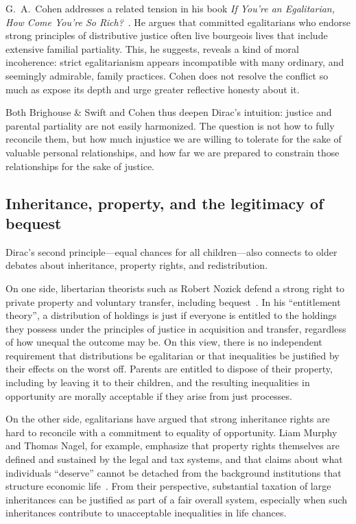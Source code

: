 \documentclass[%
  reprint,
  superscriptaddress,
  amsmath,amssymb,
  pra,
  floatfix,
  longbibliography
]{revtex4-2}
\begin{document}
G.~A.~Cohen addresses a related tension in his book
\emph{If You're an Egalitarian, How Come You're So Rich?}~\cite{Cohen2000}.
He argues that committed egalitarians who endorse strong principles of
distributive justice often live bourgeois lives that include extensive
familial partiality.  This, he suggests, reveals a kind of moral
incoherence: strict egalitarianism appears incompatible with many
ordinary, and seemingly admirable, family practices.  Cohen does not
resolve the conflict so much as expose its depth and urge greater
reflective honesty about it.

Both Brighouse \& Swift and Cohen thus deepen Dirac's intuition:
justice and parental partiality are not easily harmonized.  The
question is not how to fully reconcile them, but how much injustice we
are willing to tolerate for the sake of valuable personal
relationships, and how far we are prepared to constrain those
relationships for the sake of justice.

\subsection{Inheritance, property, and the legitimacy of bequest}

Dirac's second principle---equal chances for all children---also
connects to older debates about inheritance, property rights, and
redistribution.

On one side, libertarian theorists such as Robert Nozick defend a
strong right to private property and voluntary transfer, including
bequest~\cite{Nozick1974}.  In his ``entitlement theory'', a
distribution of holdings is just if everyone is entitled to the
holdings they possess under the principles of justice in acquisition
and transfer, regardless of how unequal the outcome may be.  On this
view, there is no independent requirement that distributions be
egalitarian or that inequalities be justified by their effects on the
worst off.  Parents are entitled to dispose of their property, including
by leaving it to their children, and the resulting inequalities in
opportunity are morally acceptable if they arise from just processes.

On the other side, egalitarians have argued that strong inheritance
rights are hard to reconcile with a commitment to equality of
opportunity.  Liam Murphy and Thomas Nagel, for example, emphasize that
property rights themselves are defined and sustained by the legal and
tax systems, and that claims about what individuals ``deserve'' cannot
be detached from the background institutions that structure economic
life~\cite{MurphyNagel2002}.  From their perspective, substantial
taxation of large inheritances can be justified as part of a fair
overall system, especially when such inheritances contribute to
unacceptable inequalities in life chances.
\end{document}
